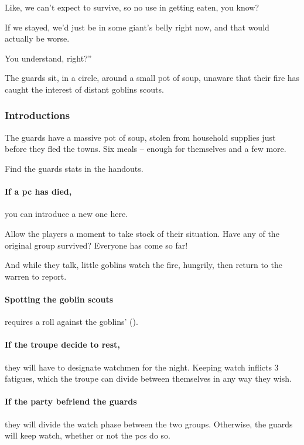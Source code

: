 \begin{multicols}{2}
\begin{speechtext}
  Like, we can't expect to survive, so no use in getting eaten, you know?

  If we stayed, we'd just be in some giant's belly right now, and that would actually be worse.

  You understand, right?''
\end{speechtext}

The \glspl{guard} sit, in a circle, around a small pot of soup, unaware that their fire has caught the interest of distant goblins scouts.

\subsubsection{Introductions}

The \glspl{guard} have a massive pot of soup, stolen from household supplies just before they fled the towns.
Six meals -- enough for themselves and a few more.

Find the \glspl{guard} stats in the handouts.

\paragraph{If a \gls{pc} has died,}
you can introduce a new one here.

Allow the players a moment to take stock of their situation.
Have any of the original group survived?
Everyone has come so far!

And while they talk, little goblins watch the fire, hungrily, then return to the warren to report.


\paragraph{Spotting the goblin scouts}
requires a  roll against the goblins'  (\tn).

\paragraph{If the troupe decide to rest,}
they will have to designate watchmen for the night.
Keeping watch inflicts 3 \glspl{fatigue}, which the troupe can divide between themselves in any way they wish.

\paragraph{If the party befriend the \glspl{guard}}
they will divide the watch phase between the two groups.
Otherwise, the \glspl{guard} will keep watch, whether or not the \glspl{pc} do so.


\end{multicols}

